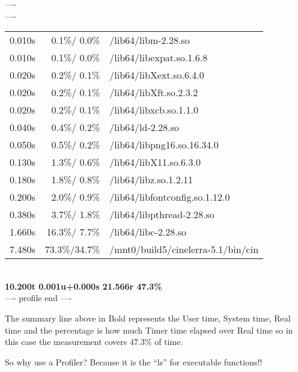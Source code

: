 ----\\
----\\
\begin{tabular}{@{}rrl}
 0.010s & 0.1\%/  0.0\% & /lib64/libm-2.28.so\\
 0.010s & 0.1\%/  0.0\% & /lib64/libexpat.so.1.6.8\\
 0.020s & 0.2\%/  0.1\% & /lib64/libXext.so.6.4.0\\
 0.020s & 0.2\%/  0.1\% & /lib64/libXft.so.2.3.2\\
 0.020s & 0.2\%/  0.1\% & /lib64/libxcb.so.1.1.0\\
 0.040s & 0.4\%/  0.2\% & /lib64/ld-2.28.so\\
 0.050s & 0.5\%/  0.2\% & /lib64/libpng16.so.16.34.0\\
 0.130s & 1.3\%/  0.6\% & /lib64/libX11.so.6.3.0\\
 0.180s & 1.8\%/  0.8\% & /lib64/libz.so.1.2.11\\
 0.200s & 2.0\%/  0.9\% & /lib64/libfontconfig.so.1.12.0\\
 0.380s & 3.7\%/  1.8\% & /lib64/libpthread-2.28.so\\
 1.660s & 16.3\%/ 7.7\% & /lib64/libc-2.28.so\\
 7.480s & 73.3\%/34.7\% & /mnt0/build5/cinelerra-5.1/bin/cin\\
\end{tabular}\\

\textbf{10.200t 0.001u+0.000s 21.566r  47.3\%}
\\
---- profile end ----
\medskip

The summary line above in Bold represents the User time, System time, Real time and the percentage is how much Timer time elapsed over Real time so in this case the measurement covers 47.3\% of time. 
\medskip

So why use a Profiler? Because it is the ``ls'' for executable functions!!
